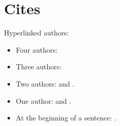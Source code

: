 \documentclass[english]{scrbook}
\begin{document}
\chapter{Cites}
Hyperlinked authors:

\begin{itemize}
  \item Four authors: \citeauthor{ABCD02} \cite{ABCD02}
  \item Three authors: \citeauthor{ABC01} \cite{ABC01}
  \item Two authors: \citeauthor{AB00} \cite{AB00} and \citeauthor{vdAW2013} \cite{vdAW2013}.
  \item One author: \citeauthor{Ez10} \cite{Ez10} and \citeauthor{Go10} \cite{Go10}.
  \item At the beginning of a sentence: .
\end{itemize}

\nocite{*}
\printbibliography
\end{document}
